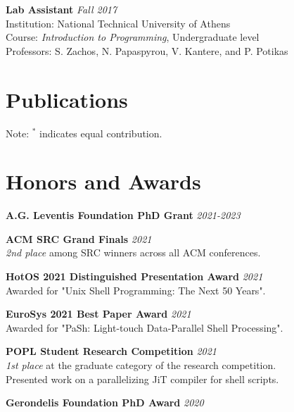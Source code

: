 \documentclass[margin]{res}
\begin{document}
\begin{resume}
\textbf{Lab Assistant}  \hfill {\em Fall 2017} \\
Institution: National Technical University of Athens \\
Course: \textit{Introduction to Programming}, Undergraduate level \\
Professors: S. Zachos, N. Papaspyrou, V. Kantere, and P. Potikas

\section{Publications}



Note: $^*$ indicates equal contribution.

\section{Honors and Awards}

\textbf{A.G. Leventis Foundation PhD Grant} \hfill {\em 2021-2023}

\textbf{ACM SRC Grand Finals} \hfill {\em 2021} \\
\textit{2nd place} among SRC winners across all ACM conferences.

\textbf{HotOS 2021 Distinguished Presentation Award} \hfill {\em 2021} \\
Awarded for "Unix Shell Programming: The Next 50 Years".

\textbf{EuroSys 2021 Best Paper Award} \hfill {\em 2021} \\
Awarded for "PaSh: Light-touch Data-Parallel Shell Processing".

\textbf{POPL Student Research Competition} \hfill {\em 2021} \\
\textit{1st place} at the graduate category of the research competition. \\
Presented work on a parallelizing JiT compiler for shell scripts. 

\textbf{Gerondelis Foundation PhD Award} \hfill {\em 2020}



\end{resume}
\end{document}
